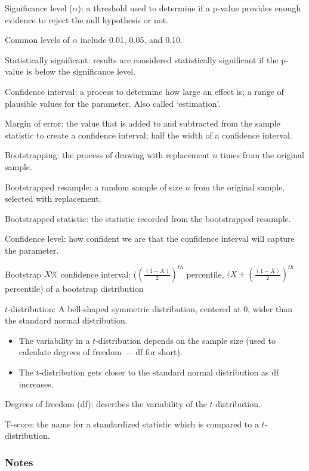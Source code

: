 \documentclass[
]{report}
\providecommand{\tightlist}{%
  \setlength{\itemsep}{0pt}\setlength{\parskip}{0pt}}
\newcommand{\rgi}{\hspace{24pt}}  %
\begin{document}
Significance level (\(\alpha\)): a threshold used to determine if a p-value provides enough evidence to reject the null hypothesis or not.

\rgi Common levels of \(\alpha\) include 0.01, 0.05, and 0.10.

Statistically significant: results are considered statistically significant if the p-value is below the significance level.

Confidence interval: a process to determine how large an effect is; a range of plausible values for the parameter. Also called `estimation'.

Margin of error: the value that is added to and subtracted from the sample statistic to create a confidence interval; half the width of a confidence interval.

Bootstrapping: the process of drawing with replacement \(n\) times from the original sample.

Bootstrapped resample: a random sample of size \(n\) from the original sample, selected with replacement.

Bootstrapped statistic: the statistic recorded from the bootstrapped resample.

Confidence level: how confident we are that the confidence interval will capture the parameter.

Bootstrap \(X\)\% confidence interval: (\((\frac{(1-X)}{2})^{th}\) percentile, \((X+(\frac{(1-X)}{2})^{th}\) percentile) of a bootstrap distribution

\(t\)-distribution: A bell-shaped symmetric distribution, centered at 0, wider than the standard normal distribution.

\begin{itemize}
\tightlist
\item
  The variability in a \(t\)-distribution depends on the sample size (used to calculate degrees of freedom --- df for short).
\item
  The \(t\)-distribution gets closer to the standard normal distribution as df increases.
\end{itemize}

Degrees of freedom (df): describes the variability of the \(t\)-distribution.

T-score: the name for a standardized statistic which is compared to a \(t\)-distribution.

\hypertarget{notes-25}{%
\subsubsection*{Notes}\label{notes-25}}
\end{document}

